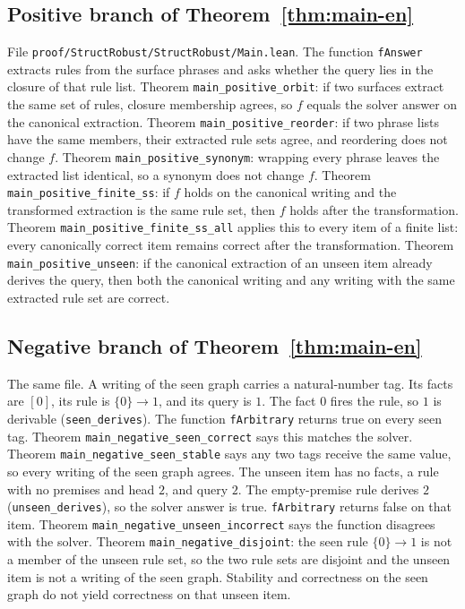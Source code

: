 \documentclass[11pt,a4paper]{article}
\theoremstyle{plain}
\begin{document}
\subsection{Positive branch of Theorem~\ref{thm:main-en}}

File \texttt{proof/StructRobust/StructRobust/Main.lean}. The function
\texttt{fAnswer} extracts rules from the surface phrases and asks whether the
query lies in the closure of that rule list. Theorem
\texttt{main\_positive\_orbit}: if two surfaces extract the same set of rules,
closure membership agrees, so $f$ equals the solver answer on the canonical
extraction. Theorem \texttt{main\_positive\_reorder}: if two phrase lists have
the same members, their extracted rule sets agree, and reordering does not
change $f$. Theorem \texttt{main\_positive\_synonym}: wrapping every phrase
leaves the extracted list identical, so a synonym does not change $f$. Theorem
\texttt{main\_positive\_finite\_ss}: if $f$ holds on the canonical writing and
the transformed extraction is the same rule set, then $f$ holds after the
transformation. Theorem \texttt{main\_positive\_finite\_ss\_all} applies this
to every item of a finite list: every canonically correct item remains correct
after the transformation. Theorem \texttt{main\_positive\_unseen}: if the
canonical extraction of an unseen item already derives the query, then both
the canonical writing and any writing with the same extracted rule set are
correct.

\subsection{Negative branch of Theorem~\ref{thm:main-en}}

The same file. A writing of the seen graph carries a natural-number tag. Its
facts are $[0]$, its rule is $\{0\}\to 1$, and its query is $1$. The fact $0$
fires the rule, so $1$ is derivable (\texttt{seen\_derives}). The function
\texttt{fArbitrary} returns true on every seen tag. Theorem
\texttt{main\_negative\_seen\_correct} says this matches the solver. Theorem
\texttt{main\_negative\_seen\_stable} says any two tags receive the same
value, so every writing of the seen graph agrees. The unseen item has no
facts, a rule with no premises and head $2$, and query $2$. The empty-premise
rule derives $2$ (\texttt{unseen\_derives}), so the solver answer is true.
\texttt{fArbitrary} returns false on that item. Theorem
\texttt{main\_negative\_unseen\_incorrect} says the function disagrees with
the solver. Theorem \texttt{main\_negative\_disjoint}: the seen rule
$\{0\}\to 1$ is not a member of the unseen rule set, so the two rule sets are
disjoint and the unseen item is not a writing of the seen graph. Stability and
correctness on the seen graph do not yield correctness on that unseen item.
\end{document}
